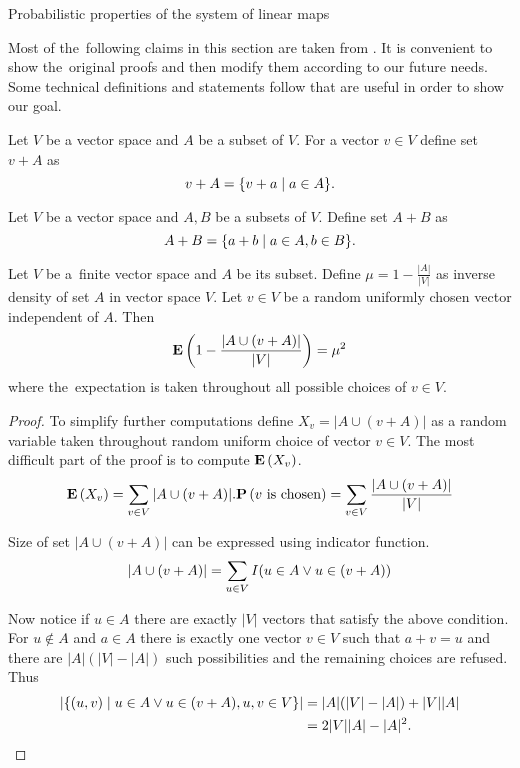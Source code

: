 \begin{section}{Probabilistic properties of the system of linear maps}

Most of the~following claims in this section are taken from \cite{DBLP:journals/jacm/AlonDMPT99}. It is convenient to show the~original proofs and then modify them according to our future needs. Some technical definitions and statements follow that are useful in order to show our goal.

\begin{definition}
Let $V$ be a vector space and $A$ be a subset of $V$. For a vector $v \in V$ define set $v + A$ as
\[ v + A = \{ v + a \mid a \in A \} \text{.} \] 
\end{definition}

\begin{definition}
Let $V$ be a vector space and $A, B$ be a subsets of $V$. Define set $A + B$ as
\[ A + B = \{ a + b \mid a \in A, b \in B \} \text{.} \] 
\end{definition}

\begin{lemma}
\label{lemma-choose-random-vector}
Let $V$ be a~finite vector space and $A$ be its subset. Define $\mu = 1 - \frac{|A|}{|V|}$ as inverse density of set $A$ in vector space $V$. Let $v \in V$ be a random uniformly chosen vector independent of $A$. Then
\begin{displaymath}
\mathbf{E}\left(1 - \frac{|A \cup (v + A)|}{|V|}\right) = \mu^2
\end{displaymath}
where the~expectation is taken throughout all possible choices of $v \in V$.

\begin{proof}
To simplify further computations define $X_v = |A \cup (v + A)|$ as a random variable taken throughout random uniform choice of vector $v \in V$. The most difficult part of the proof is to compute $\mathbf{E}\left(X_v\right)$.
\[
\mathbf{E}\left(X_v\right) = \displaystyle\sum_{v \in V} |A \cup (v + A)| . \mathbf{P}\left(v \text{ is chosen}\right) = \displaystyle\sum_{v \in V} \frac{|A \cup (v + A)|}{|V|}
\]

Size of set $|A \cup (v + A)|$ can be expressed using indicator function.
\[
|A \cup (v + A)| = \displaystyle\sum_{u \in V} I(u \in A \vee u \in (v + A)) \\
\]

Now notice if $u \in A$ there are exactly $|V|$ vectors that satisfy the above condition. For $u \notin A$ and $a \in A$ there is exactly one vector $v \in V$ such that $a + v = u$ and there are $|A|(|V| - |A|)$ such possibilities and the remaining choices are refused. Thus
\[ 
\begin{split}
|\{(u, v) \mid u \in A \vee u \in (v + A), u, v \in V \}| 
	& = |A|(|V| - |A|) + |V||A| \\
	& = 2|V||A| - |A|^2 \text{.} \\
\end{split}
\]


\end{proof}
\end{lemma}
\end{section}
